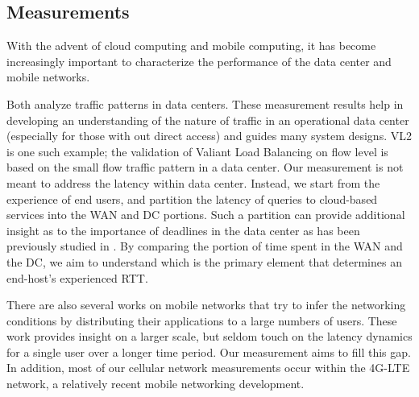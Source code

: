 \subsection{Measurements}
\label{sec:measurements}

With the advent of cloud computing and mobile computing, it has become increasingly important to characterize the performance of the data center and mobile networks. 

Both \cite{benson2010network, kandula2009nature} analyze traffic patterns in data centers. These measurement results help in developing an understanding of the nature of traffic in an operational data center (especially for those with out direct access) and guides many system designs. VL2 \cite{greenberg2009vl2} is one such example; the validation of Valiant Load Balancing on flow level is based on the small flow traffic pattern in a data center. Our measurement is not meant to address the latency within data center. Instead, we start from the experience of end users, and partition the latency of queries to cloud-based services into the WAN and DC portions. Such a partition can provide additional insight as to the importance of deadlines in the data center as has been previously studied in \cite{wilson2011better}. By comparing the portion of time spent in the WAN and the DC, we aim to understand which is the primary element that determines an end-host's experienced RTT.

There are also several works on mobile networks \cite{xu2011cellular, huang2011mobiperf} that try to infer the networking conditions by distributing their applications to a large numbers of users. These work provides insight on a larger scale, but seldom touch on the latency dynamics for a single user over a longer time period. Our measurement aims to fill this gap. In addition, most of our cellular network measurements occur within the 4G-LTE network, a relatively recent mobile networking development.





